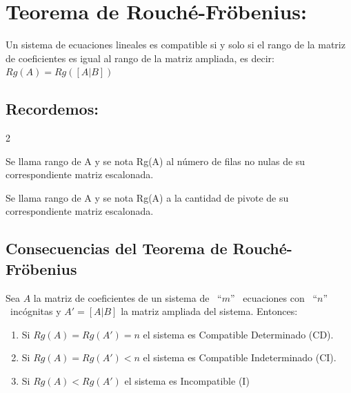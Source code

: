 \documentclass[11pt]{article}
\newcounter{teo}%
\begin{document}
\section{{Teorema de Rouché-Fröbenius: }}

\begin{mdframed}[style= teoSty,frametitle={Teorema de Rouché-Fröbenius: }] 

Un sistema de ecuaciones lineales es compatible si y solo si el rango de la matriz de coeficientes es igual al rango de la
matriz ampliada, es decir: $Rg (A) = Rg ([A|B])$

\end{mdframed}

\subsection{Recordemos:}


\begin{multicols}{2}
    
\begin{mdframed}[style=teoSty,frametitle={ Definición: }]
Se llama rango de A y se nota Rg(A) al número de filas no nulas de su
correspondiente matriz escalonada.
\end{mdframed} 

\bigskip   


\begin{mdframed}[style=teoSty,frametitle={ Definición alternativa: }]
Se llama rango de A y se nota Rg(A) a la cantidad de pivote de su correspondiente matriz escalonada.
\end{mdframed} 

\end{multicols}



\subsection{Consecuencias del Teorema de Rouché-Fröbenius}
    
\begin{mdframed}[style= teoSty,frametitle={Consecuencias: }] 
 Sea $A$ la matriz de coeficientes de un sistema de \ ``$m$'' \ ecuaciones con \ ``$n$'' \ incógnitas y $A'= [A|B]$ la matriz ampliada del sistema. Entonces:
 \begin{enumerate}[1) ]
\item  Si $Rg (A) = Rg (A') = n$ el sistema es Compatible Determinado (CD).

\item  Si $Rg (A) = Rg (A') < n$ el sistema es Compatible Indeterminado (CI).



\item Si $Rg (A) < Rg (A') $ el sistema es Incompatible (I)
 \end{enumerate}

\end{mdframed}
\end{document}
